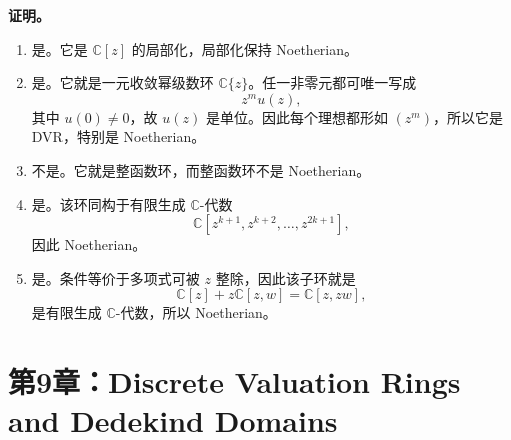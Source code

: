 \documentclass[a4paper]{ctexart}
\begin{document}
\begin{enumerate}[leftmargin=*, label=\textbf{8.\arabic*.}]
\textbf{证明。}
\begin{enumerate}[label=(\roman*)]
\item 是。它是 \(\mathbb C[z]\) 的局部化，局部化保持 Noetherian。
\item 是。它就是一元收敛幂级数环 \(\mathbb C\{z\}\)。任一非零元都可唯一写成
\[
z^m u(z),
\]
其中 \(u(0)\neq 0\)，故 \(u(z)\) 是单位。因此每个理想都形如 \((z^m)\)，所以它是 DVR，特别是 Noetherian。
\item 不是。它就是整函数环，而整函数环不是 Noetherian。
\item 是。该环同构于有限生成 \(\mathbb C\)-代数
\[
\mathbb C[z^{k+1},z^{k+2},\dots,z^{2k+1}],
\]
因此 Noetherian。
\item 是。条件等价于多项式可被 \(z\) 整除，因此该子环就是
\[
\mathbb C[z]+z\mathbb C[z,w]=\mathbb C[z,zw],
\]
是有限生成 \(\mathbb C\)-代数，所以 Noetherian。
\end{enumerate}
\end{enumerate}

\section{第9章：Discrete Valuation Rings and Dedekind Domains}
\end{document}
